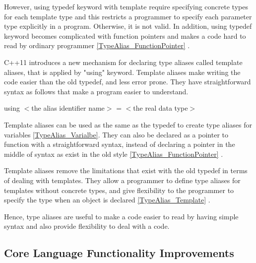 \documentclass[11pt]{report}
\begin{document}
\begin{enumerate}
However, using typedef keyword with template require specifying concrete types for each template type and this restricts a programmer to specify each parameter type explicitly in a program. Otherwise, it is not valid. In addition, using typedef keyword becomes complicated with function pointers and makes a code hard to read by ordinary programmer \ref{TypeAlias_FunctionPointer} \cite{Gregorie:professionalcpp}.
\newline

C++11 introduces a new mechanism for declaring type aliases called template aliases, that is applied by "using" keyword.  Template aliases make writing the code easier than the old typedef, and less error prone. They have straightforward syntax as follows that make a program easier to understand.

\begin{center}
using $<$the alias identifier name$>$ = $<$the real data type$>$
\end{center}

Template aliases can be used as the same as the typedef to create type aliases for variables \ref{TypeAlias_Varialbe}. They can also be declared as a pointer to function with a straightforward syntax, instead of declaring a pointer in the middle of syntax as exist in the old style \ref{TypeAlias_FunctionPointer} \cite{Gregorie:professionalcpp}.
\newline

Template aliases remove the limitations that exist with the old typedef in terms of dealing with templates. They allow a programmer to define type aliases for templates without concrete types, and give flexibility to the programmer to specify the type when an object is declared \ref{TypeAlias_Template} \cite{Gregorie:professionalcpp}.
\newline

Hence, type aliases are useful to make a code easier to read by having simple syntax and also provide flexibility to deal with a code.

\end{enumerate}

\subsection{Core Language Functionality Improvements}
\label{subsection: Functionality Improvements}
\end{document}
